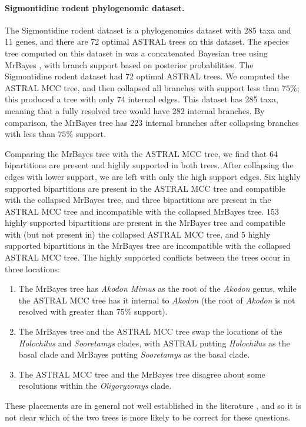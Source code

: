 \paragraph{Sigmontidine rodent  phylogenomic dataset. }
The Sigmontidine rodent dataset is a phylogenomics dataset with 285 taxa and 11 genes, and there are 72 optimal ASTRAL trees on this dataset. 
The species tree computed on this dataset in \cite{maestri2017ecology} was a concatenated Bayesian tree using MrBayes \cite{ronquist2012mrbayes}, with branch support based on posterior probabilities. The Sigmontidine rodent dataset had 72 optimal ASTRAL trees. 
We computed the ASTRAL MCC tree, and then collapsed all branches with support less than   $75\%$; this produced a tree with only 74 internal edges.  This dataset has 285 taxa, meaning that a fully resolved tree would have 282 internal branches.  By comparison, the MrBayes tree has 223 internal branches after collapsing branches with less than $75\%$ support. 

Comparing the MrBayes tree with the ASTRAL MCC tree, we find that 64 bipartitions are present and highly supported in both trees.  After collapsing the edges with lower support, we are left with only the high support edges. Six  highly supported bipartitions are present in the ASTRAL MCC tree and compatible with the collapsed MrBayes tree, and  three bipartitions are present in the ASTRAL MCC tree and incompatible with the collapsed MrBayes tree.  153 highly supported bipartitions are present in the MrBayes tree and compatible with (but not present in) the collapsed ASTRAL MCC tree, and 5 highly supported bipartitions in the MrBayes tree are incompatible with the collapsed ASTRAL MCC tree.  The highly supported conflicts between the trees occur in three locations:
\begin{enumerate}
\item The MrBayes tree has \emph{Akodon Mimus} as the root of the \emph{Akodon} genus, while the ASTRAL MCC tree has it internal to \emph{Akodon} (the root of \emph{Akodon} is not resolved with greater than 75\% support). 
\item The MrBayes tree and the ASTRAL MCC tree swap the locations of the \emph{Holochilus} and \emph{Sooretamys} clades, with ASTRAL putting \emph{Holochilus} as the basal clade and  MrBayes  putting \emph{Sooretamys} as the basal clade. 
\item The ASTRAL MCC tree and the MrBayes tree disagree about some resolutions within the \emph{Oligoryzomys} clade. 
\end{enumerate}
These placements are in general not well established in the literature \cite{alvarado2013new,gonzalez2014molecular,machado2014phylogeny}, and so it is not clear which of the two trees is more likely to be correct for these questions.


